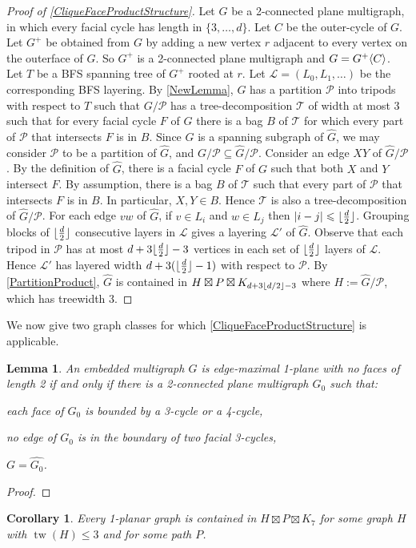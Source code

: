 \documentclass{patmorin}
\theoremstyle{plain}
\newtheorem{lem}[thm]{Lemma}
\newtheorem{cor}[thm]{Corollary}
\theoremstyle{definition}
\newcommand{\note}[2]{\noindent{\color{red}[#1:~#2]}}
\DeclareMathOperator{\tw}{tw}
\DeclarePairedDelimiter{\floor}{\lfloor}{\rfloor}
\DeclarePairedDelimiter{\blah}{\langle}{\rangle}
\newcommand{\TT}{\mathcal{T}}
\newcommand{\PP}{\mathcal{P}}
\renewcommand{\leq}{\leqslant}
\begin{document}
\begin{proof}[Proof of \cref{CliqueFaceProductStructure}]
Let $G$ be a 2-connected plane multigraph, in which every facial cycle has length in $\{3,\dots,d\}$. Let $C$ be the outer-cycle of $G$. Let $G^+$ be obtained from $G$ by adding a new vertex $r$ adjacent to every vertex on the outerface of $G$. So $G^+$ is a 2-connected plane multigraph and $G=G^+\blah{C}$. Let $T$ be a BFS spanning tree of $G^+$ rooted at $r$. Let $\mathcal{L}=(L_0,L_1,\dots)$ be the corresponding BFS layering. By \cref{NewLemma}, $G$ has a partition $\PP$ into tripods with respect to $T$ such that $G / \PP$ has a tree-decomposition $\mathcal{T}$ of width at most 3 such that for every facial cycle $F$ of $G$ there is a bag $B$ of $\mathcal{T}$ for which every part of $\PP$ that intersects $F$ is in $B$. Since $G$ is a spanning subgraph of $\widehat{G}$, we may consider $\PP$ to be a partition of $\widehat{G}$, and $G/\PP \subseteq \widehat{G}/\PP$. Consider an edge $XY$ of $\widehat{G}/\PP$. By the definition of $\widehat{G}$, there is a facial cycle $F$ of $G$ such that both $X$ and $Y$ intersect $F$. By assumption, there is a bag $B$ of $\mathcal{T}$ such that every part of $\PP$ that intersects $F$ is in $B$. In particular, $X,Y\in B$. Hence $\TT$ is also a tree-decomposition of $\widehat{G}/\PP$. For each edge $vw$ of $\widehat{G}$, if $v\in L_i$ and $w\in L_j$ then $|i-j|\leq\floor{\frac{d}{2}}$. Grouping blocks of $\floor{\frac{d}{2}}$ consecutive layers in $\mathcal{L}$ gives a layering $\mathcal{L}'$ of $\widehat{G}$. Observe that each tripod in $\PP$ has at most $d+3\floor{\frac{d}{2}}-3$ vertices in each set of $\floor{\frac{d}{2}}$ layers of $\mathcal{L}$. Hence $\mathcal{L}'$ has layered width $d+3( \floor{\frac{d}{2}}-1)$ with respect to $\PP$. By \cref{PartitionProduct}, $\widehat{G}$ is contained in $H \boxtimes P \boxtimes K_{d+3\floor{d/2}-3}$ where $H:=\widehat{G}/\PP$, which has treewidth 3. \note{DW}{This proof needs to be changed to show that $G/\PP = \widehat{G}/\PP$, so $H$ is a minor of $G$ and is thus planar.}
\end{proof}

We now give two graph classes for which \cref{CliqueFaceProductStructure} is applicable.

\begin{lem}
	An embedded multigraph $G$ is edge-maximal 1-plane with no faces of length 2 if and only if there is a 2-connected plane multigraph $G_0$ such that:
	\begin{compactitem}
		\item each face of $G_0$ is bounded by a 3-cycle or a 4-cycle,
		\item no edge of $G_0$ is in the boundary of two facial 3-cycles,
		\item $G=\widehat{G_0}$.
	\end{compactitem}
\end{lem}

\begin{proof}
\end{proof}

\begin{cor}
	\label{New1Planar}
	Every 1-planar graph is contained in $H \boxtimes P \boxtimes K_7$ for some graph $H$ with $\tw(H) \leq 3$ and for some path $P$.
\end{cor}
\end{document}
